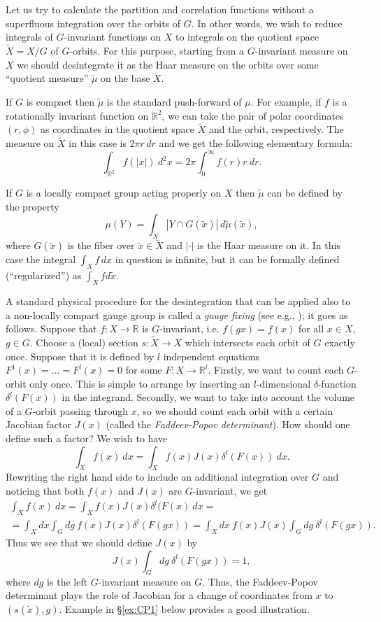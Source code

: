 \documentclass[10pt]{amsart}
\theoremstyle{definition}
\theoremstyle{remark}
\newcommand{\R}{\mathbb R}
\newcommand{\tX}{\widetilde{X}}
\newcommand{\Gd}{\delta}
\begin{document}
Let us try to calculate the partition and correlation functions
without a superfluous integration over the orbits of $G$.
In other words, we wish to reduce integrals of $G$-invariant
functions on $X$ to integrals on the quotient space $\tX=X/G$
of $G$-orbits.
For this purpose, starting from a $G$-invariant measure on $X$
we should desintegrate it as the Haar measure  on the orbits over
some ``quotient measure''  $\tilde\mu$ on the base $\tX$.

If $G$ is compact then $\tilde\mu$ is the standard push-forward of $\mu$.
For example, if $f$ is a rotationally invariant function on $\R^2$,
we can take the pair of polar coordinates $(r,\phi)$ as coordinates
in the quotient space $\tX$ and the orbit, respectively.
The measure on $\tX$ in this case is $2\pi r\, dr$ and we get the
following elementary formula:
$$
  \int_{\R^2}f(|x|)\ d^2x=2\pi\int_0^\infty f(r) r\ dr.
$$

If $G$ is a locally compact group acting properly on $X$ then $\tilde\mu$ can be
defined by the property
$$
    \mu(Y) = \int_{\tX} | Y\cap G(\tilde x)|\, d\tilde\mu(\tilde x),
$$
where $G(\tilde x)$ is the fiber over $\tilde x\in \tX$ and $|\cdot|$ is the Haar measure on it.
In this case the integral $\int_X f\, dx$  in question is infinite,
but it can be formally defined  (``regularized'') as $\int_{\tilde X} f d\tilde x$.

A standard physical procedure for the desintegration that can be
applied also to a non-locally compact gauge group is called a
{\em gauge  fixing} (see e.g., \cite{Sc}); it goes as follows.
Suppose that $f:X\to\R$ is $G$-invariant, i.e. $f(gx)=f(x)$ for
all $x\in X$, $g\in G$. Choose a (local) section $s:\tX\to
X$ which intersects each orbit of $G$ exactly once.
Suppose that it is defined by $l$ independent equations
$F^1(x)=\dots=F^l(x)=0$ for some $F:X\to\R^l$.
Firstly, we want to count each $G$-orbit only once.
This is simple to arrange by inserting an $l$-dimensional
$\Gd$-function $\Gd^l(F(x))$ in the integrand. Secondly, we want
to take into account the volume of a $G$-orbit passing through $x$,
so we should count each orbit with a certain Jacobian factor
$J(x)$ (called the {\em Faddeev-Popov determinant}).
How should one define such a factor? We wish to have
$$
  \int_X f(x)\ dx=\int_X f(x) J(x) \Gd^l(F(x))\ dx.
$$
Rewriting the right hand side to include an additional
integration over $G$ and noticing that both $f(x)$ and
$J(x)$ are $G$-invariant, we get
\begin{multline*}
    \int_X f(x)\ dx=\int_X f(x) J(x) \Gd^l(F(x)\ dx=\\
    =\int_X dx \int_G dg\ f(x) J(x) \Gd^l(F(gx))=
    \int_X dx\ f(x) J(x)\int_Gdg\ \Gd^l(F(gx)).
\end{multline*}
Thus we see that we should define $J(x)$ by
$$
           J(x)\int_G dg\ \Gd^l(F(gx))=1,
$$
where $dg$ is the left $G$-invariant measure on $G$.
Thus, the Faddeev-Popov determinant plays the
role of Jacobian for a change of coordinates from $x$ to
$(s(\tilde{x}),g)$.
Example in \S \ref{ex:CP1} below provides a good illustration.
\end{document}
